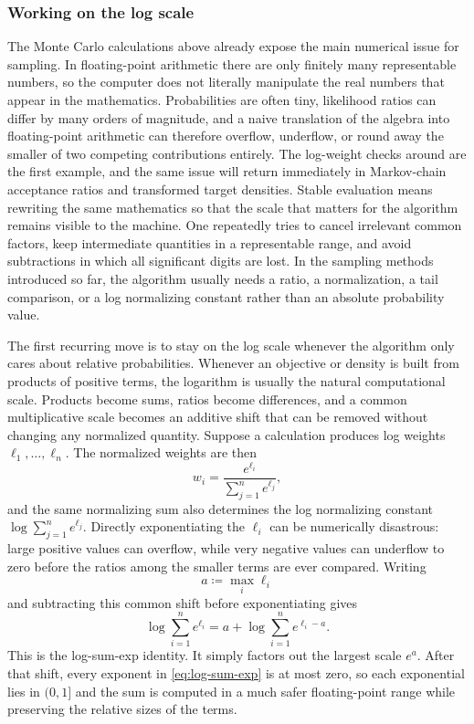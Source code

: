 \subsubsection{Working on the log scale}
\label{subsec:stable-evaluation}
\label{subsubsec:working-on-log-scale}

The Monte Carlo calculations above already expose the main numerical issue for sampling.
In floating-point arithmetic there are only finitely many representable numbers, so the computer does not literally manipulate the real numbers that appear in the mathematics.
Probabilities are often tiny, likelihood ratios can differ by many orders of magnitude, and a naive translation of the algebra into floating-point arithmetic can therefore overflow, underflow, or round away the smaller of two competing contributions entirely.
The log-weight checks around  are the first example, and the same issue will return immediately in Markov-chain acceptance ratios and transformed target densities.
Stable evaluation means rewriting the same mathematics so that the scale that matters for the algorithm remains visible to the machine.
One repeatedly tries to cancel irrelevant common factors, keep intermediate quantities in a representable range, and avoid subtractions in which all significant digits are lost.
In the sampling methods introduced so far, the algorithm usually needs a ratio, a normalization, a tail comparison, or a log normalizing constant rather than an absolute probability value.

The first recurring move is to stay on the log scale whenever the algorithm only cares about relative probabilities.
Whenever an objective or density is built from products of positive terms, the logarithm is usually the natural computational scale.
Products become sums, ratios become differences, and a common multiplicative scale becomes an additive shift that can be removed without changing any normalized quantity.
Suppose a calculation produces log weights $\ell_1,\dots,\ell_n$.
The normalized weights are then
\[
  w_i = \frac{e^{\ell_i}}{\sum_{j=1}^n e^{\ell_j}},
\]
and the same normalizing sum also determines the log normalizing constant $\log \sum_{j=1}^n e^{\ell_j}$.
Directly exponentiating the $\ell_i$ can be numerically disastrous: large positive values can overflow, while very negative values can underflow to zero before the ratios among the smaller terms are ever compared.
Writing
\[
  a \coloneqq \max_i \ell_i
\]
and subtracting this common shift before exponentiating gives
\begin{equation}
  \log \sum_{i=1}^n e^{\ell_i}
  =
  a + \log \sum_{i=1}^n e^{\ell_i-a}.
  \label{eq:log-sum-exp}
\end{equation}
This is the log-sum-exp identity.
It simply factors out the largest scale $e^a$.
After that shift, every exponent in \eqref{eq:log-sum-exp} is at most zero, so each exponential lies in $(0,1]$ and the sum is computed in a much safer floating-point range while preserving the relative sizes of the terms.

